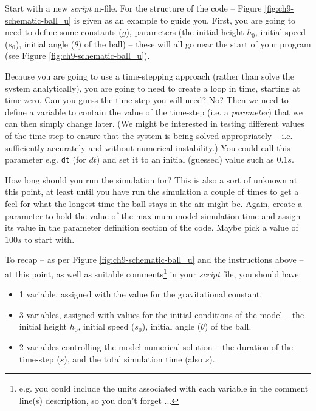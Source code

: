 \documentclass{tufte-book} %
\begin{document}
 Start with a new \textit{script} \textsf{m-file}. For the structure of the code -- Figure \ref{fig:ch9-schematic-ball_u} is given as an example to guide you. First, you are going to need to define some constants (\(g\)), parameters (the initial height \(h_{0}\), initial speed (\(s_{0}\)), initial angle (\(\theta\)) of the ball) -- these will all go near the start of your program (see Figure \ref{fig:ch9-schematic-ball_u}).

Because you are going to use a time-stepping approach (rather than solve the system analytically), you are going to need to create a loop in time, starting at time zero. Can you guess the time-step you will need? No? Then we need to define a variable to contain the value of the time-step (i.e. a \textit{parameter}) that we can then simply change later. (We might be interested in testing different values of the time-step to ensure that the system is being solved appropriately -- i.e. sufficiently accurately and without numerical instability.) You could call this parameter e.g. \texttt{dt} (for \(dt\)) and set it to an initial (guessed) value such as \(0.1s\). 

How long should you run the simulation for? This is also a sort of unknown at this point, at least until you have run the simulation a couple of times to get a feel for what the longest time the ball stays in the air might be. Again, create a parameter to hold the value of the maximum model simulation time and assign its value in the parameter definition section of the code. Maybe pick a value of \(100s\) to start with.

To recap -- as per Figure \ref{fig:ch9-schematic-ball_u} and the instructions above -- at this point, as well as suitable comments\footnote{e.g. you could include the units associated with each variable in the comment line(s) description, so you don't forget ...} in your \textit{script} file, you should have:
\begin{itemize}[noitemsep]
\item 1 variable, assigned with the value for the gravitational constant.
\item 3 variables, assigned with values for the initial conditions of the model -- the initial height \(h_{0}\), initial speed (\(s_{0}\)), initial angle (\(\theta\)) of the ball.
\item 2 variables controlling the model numerical solution -- the duration of the time-step (\(s\)), and the total simulation time (also \(s\)).
\end{itemize}
\end{document}
